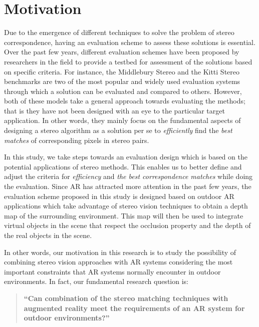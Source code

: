 \section {Motivation}

Due to the emergence of different techniques to solve the problem of stereo correspondence, having an evaluation scheme to assess 
these solutions is essential. Over the past few years, different evaluation schemes have been proposed 
by researchers in the field to provide a testbed for assessment of the solutions based on specific criteria.
For instance, the Middlebury Stereo \cite{mideval} and the Kitti Stereo benchmarks \cite{kitti}
are two of the most popular and widely used evaluation systems through which a solution can be evaluated and compared 
to others. 
However, both of these models take a general approach towards evaluating the methods; that is they 
have not been designed with an eye to the particular target application. In other words, 
they mainly focus on the fundamental aspects of designing a stereo algorithm as a solution per se to \textit{efficiently}
find the \textit{best matches} of corresponding pixels in stereo pairs. 

In this study, we take steps towards an evaluation design which is based on the potential 
applications of stereo methods.
This enables us to better define and adjust the criteria for \textit{efficiency} and 
\textit{the best correspondence matches} while doing the evaluation.
Since AR has attracted more attention in the past few years, 
the evaluation scheme proposed in this study is designed based on outdoor AR applications which take advantage of
stereo vision techniques to obtain a depth map of the surrounding environment. This map will then be used to
integrate virtual objects in the scene that respect the occlusion property and the depth of the real objects in the scene. 

In other words, our motivation in this research is to study the possibility of combining stereo vision approaches with 
AR systems considering the most important constraints that AR systems
normally encounter in outdoor environments. 
In fact, our fundamental research question is: \newline

\begin{quote}
\textbf{``Can combination of the stereo matching techniques with augmented reality meet the requirements of an AR system for outdoor 
environments?''} \newline
\end{quote}

